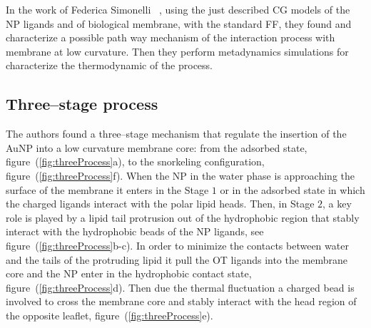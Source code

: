 In the work of Federica Simonelli \etal\, \cite{ourPaper}, using the just described \ac{CG} \martini models of the \ac{NP} ligands and of biological membrane, with the standard \martini \ac{FF}, they found and characterize a possible path way mechanism of the interaction process with membrane at low curvature. Then they perform metadynamics simulations for characterize the thermodynamic of the process.

\subsection{Three--stage process}
The authors found a three--stage mechanism that regulate the insertion of the \ac{AuNP} into a low curvature membrane core: from the adsorbed state, figure~(\ref{fig:threeProcess}a), to the snorkeling configuration, figure~(\ref{fig:threeProcess}f). When the \ac{NP} in the water phase is approaching the surface of the membrane it enters in the Stage $1$ or in the adsorbed state in which the charged ligands interact with the polar lipid heads. Then, in Stage $2$, a key role is played by a lipid tail protrusion out of the hydrophobic region that stably interact with the hydrophobic beads of the \ac{NP} ligands, see figure~(\ref{fig:threeProcess}b-c). In order to minimize the contacts between water and the tails of the protruding lipid it pull the \ac{OT} ligands into the membrane core and the \ac{NP} enter in the hydrophobic contact state, figure~(\ref{fig:threeProcess}d). Then due the thermal fluctuation a charged bead is involved to cross the membrane core and stably interact with the head region of the opposite leaflet, figure~(\ref{fig:threeProcess}e).
